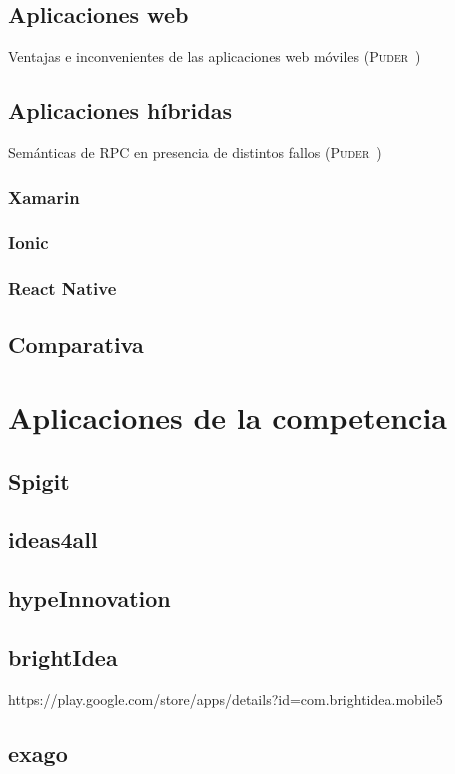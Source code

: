 \subsection{Aplicaciones web}

\begin{table}[web]
	\centering
	{\small
		
	}
	\caption[Ventajas e inconvenientes de las aplicaciones web móviles]
	{Ventajas e inconvenientes de las aplicaciones web móviles
		(\textsc{Puder}~\cite{TIPAPP})}
	\label{tab:web}
\end{table}

\subsection{Aplicaciones híbridas}

\begin{table}[hibridas]
	\centering
	{\small
		
	}
	\caption[Ventajas e inconvenientes de las aplicaciones móviles híbridas]
	{Semánticas de \acs{RPC} en presencia de distintos fallos
		(\textsc{Puder}~\cite{puder05:_distr_system_archit})}
	\label{tab:hibridas}
\end{table}

\subsubsection{Xamarin}
\subsubsection{Ionic}
\subsubsection{React Native}

\subsection{Comparativa}


\section{Aplicaciones de la competencia}
\subsection{Spigit}
\subsection{ideas4all}
\subsection{hypeInnovation}
\subsection{brightIdea}
https://play.google.com/store/apps/details?id=com.brightidea.mobile5
\subsection{exago}

